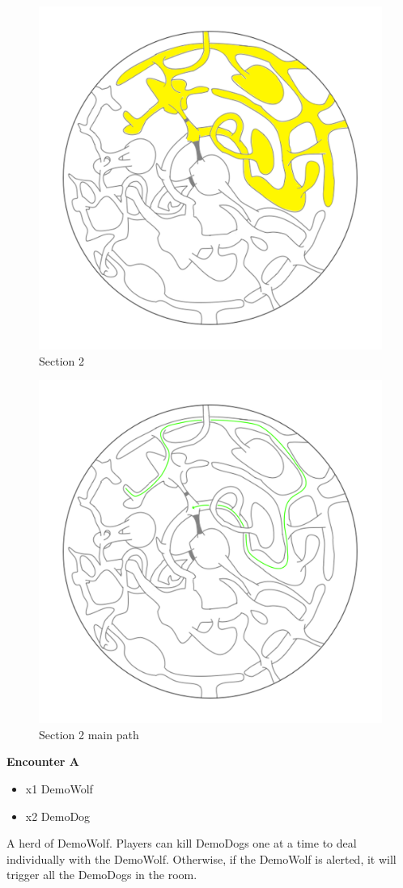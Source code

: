 \begin{figure}[H]
	\centering
	\includegraphics[width=0.7\linewidth]{images/map/2D_map_section_02.png}
	\caption*{Section 2}
\end{figure}

\begin{figure}[H]
	\centering
	\includegraphics[width=0.7\linewidth]{images/map/map_principle_path_section_02.png}
	\caption*{Section 2 main path}
\end{figure}

\textbf{Encounter A}
\begin{itemize}
	\item x1 DemoWolf
	\item x2 DemoDog
\end{itemize}
A herd of DemoWolf. Players can kill DemoDogs one at a time to deal individually with the DemoWolf. Otherwise, if the DemoWolf is alerted, it will trigger all the DemoDogs in the room.\\

